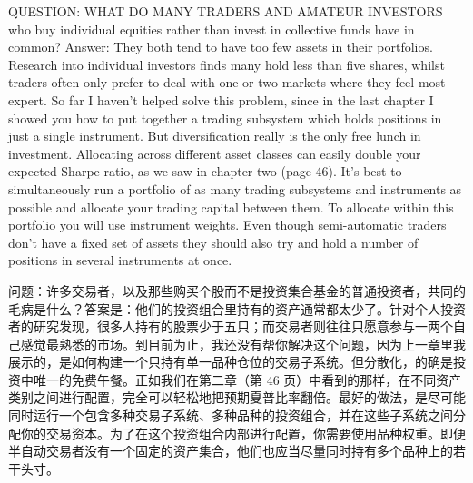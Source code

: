 
\begin{englishblock} QUESTION: WHAT DO MANY TRADERS AND AMATEUR INVESTORS who buy individual equities rather than invest in collective funds have in common? Answer: They both tend to have too few assets in their portfolios. Research into individual investors finds many hold less than five shares, whilst traders often only prefer to deal with one or two markets where they feel most expert. So far I haven't helped solve this problem, since in the last chapter I showed you how to put together a trading subsystem which holds positions in just a single instrument. But diversification really is the only free lunch in investment. Allocating across different asset classes can easily double your expected Sharpe ratio, as we saw in chapter two (page 46). It's best to simultaneously run a portfolio of as many trading subsystems and instruments as possible and allocate your trading capital between them. To allocate within this portfolio you will use instrument weights. Even though semi-automatic traders don't have a fixed set of assets they should also try and hold a number of positions in several instruments at once. \end{englishblock}

\begin{chineseblock}问题：许多交易者，以及那些购买个股而不是投资集合基金的普通投资者，共同的毛病是什么？答案是：他们的投资组合里持有的资产通常都太少了。针对个人投资者的研究发现，很多人持有的股票少于五只；而交易者则往往只愿意参与一两个自己感觉最熟悉的市场。到目前为止，我还没有帮你解决这个问题，因为上一章里我展示的，是如何构建一个只持有单一品种仓位的交易子系统。但分散化，的确是投资中唯一的免费午餐。正如我们在第二章（第 46 页）中看到的那样，在不同资产类别之间进行配置，完全可以轻松地把预期夏普比率翻倍。最好的做法，是尽可能同时运行一个包含多种交易子系统、多种品种的投资组合，并在这些子系统之间分配你的交易资本。为了在这个投资组合内部进行配置，你需要使用品种权重。即便半自动交易者没有一个固定的资产集合，他们也应当尽量同时持有多个品种上的若干头寸。\end{chineseblock}


